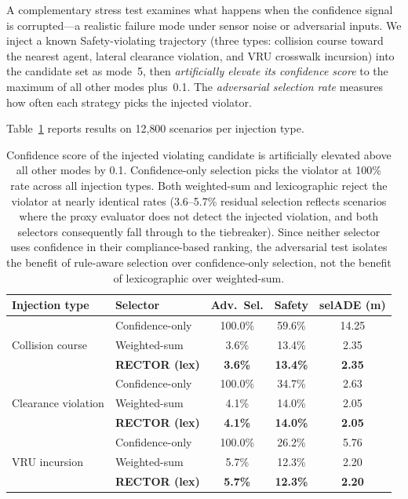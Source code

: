 A complementary stress test examines what happens when the confidence signal is corrupted---a realistic failure mode under sensor noise or adversarial inputs.  We inject a known Safety-violating trajectory (three types: collision course toward the nearest agent, lateral clearance violation, and VRU crosswalk incursion) into the candidate set as mode~5, then \emph{artificially elevate its confidence score} to the maximum of all other modes plus~0.1.  The \emph{adversarial selection rate} measures how often each strategy picks the injected violator.

Table~\ref{tab:adversarial_injection} reports results on 12{,}800 scenarios per injection type.

\begin{table}[t]
\centering
\caption{Adversarial Confidence Injection: Selection Rate for Injected Violator}
\label{tab:adversarial_injection}
\setlength{\tabcolsep}{3pt}
\begin{tabular}{llccc}
\toprule
\textbf{Injection type} & \textbf{Selector} & \textbf{Adv.\ Sel.} & \textbf{Safety} & \textbf{selADE (m)} \\
\midrule
\multirow{3}{*}{Collision course}
  & Confidence-only & 100.0\% & 59.6\% & 14.25 \\
  & Weighted-sum    &   3.6\% & 13.4\% &  2.35 \\
  & \textbf{RECTOR (lex)} & \textbf{3.6\%} & \textbf{13.4\%} & \textbf{2.35} \\
\midrule
\multirow{3}{*}{Clearance violation}
  & Confidence-only & 100.0\% & 34.7\% &  2.63 \\
  & Weighted-sum    &   4.1\% & 14.0\% &  2.05 \\
  & \textbf{RECTOR (lex)} & \textbf{4.1\%} & \textbf{14.0\%} & \textbf{2.05} \\
\midrule
\multirow{3}{*}{VRU incursion}
  & Confidence-only & 100.0\% & 26.2\% &  5.76 \\
  & Weighted-sum    &   5.7\% & 12.3\% &  2.20 \\
  & \textbf{RECTOR (lex)} & \textbf{5.7\%} & \textbf{12.3\%} & \textbf{2.20} \\
\bottomrule
\end{tabular}
\vspace{1mm}
\caption*{\footnotesize Confidence score of the injected violating candidate is artificially elevated above all other modes by 0.1.  Confidence-only selection picks the violator at 100\% rate across all injection types.  Both weighted-sum and lexicographic reject the violator at nearly identical rates (3.6--5.7\% residual selection reflects scenarios where the proxy evaluator does not detect the injected violation, and both selectors consequently fall through to the tiebreaker).  Since neither selector uses confidence in their compliance-based ranking, the adversarial test isolates the benefit of rule-aware selection over confidence-only selection, not the benefit of lexicographic over weighted-sum.}
\end{table}

